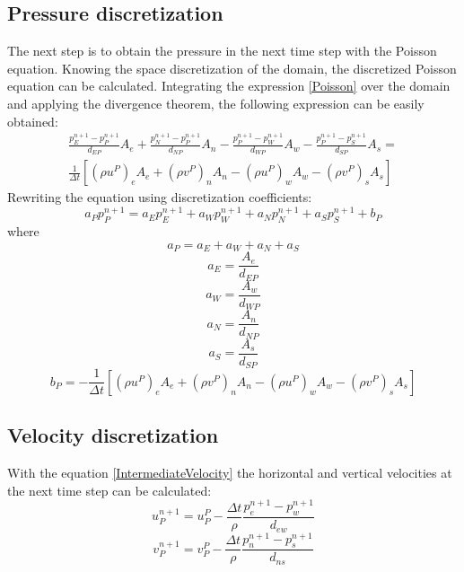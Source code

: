 \subsection{Pressure discretization}
The next step is to obtain the pressure in the next time step with the Poisson equation. Knowing the space discretization of the domain, the discretized Poisson equation can be calculated. Integrating the expression \ref{Poisson} over the domain and applying the divergence theorem, the following expression can be easily obtained:
\begin{equation}
\begin{aligned}
\frac{p_{E}^{n+1}-p_{P}^{n+1}}{d_{EP}}A_{e}+\frac{p_{N}^{n+1}-p_{P}^{n+1}}{d_{NP}}A_{n}-\frac{p_{P}^{n+1}-p_{W}^{n+1}}{d_{WP}}A_{w}-\frac{p_{P}^{n+1}-p_{S}^{n+1}}{d_{SP}}A_{s}= \\
\frac{1}{\Delta t}\left[\left(\rho u^{P}\right)_{e}A_{e}+\left(\rho v^{P}\right)_{n}A_{n}-\left(\rho u^{P}\right)_{w}A_{w}-\left(\rho v^{P}\right)_{s}A_{s}\right]
\end{aligned}
\end{equation}
Rewriting the equation using discretization coefficients:
\begin{equation}
a_{P}p_{P}^{n+1}=a_{E}p_{E}^{n+1}+a_{W}p_{W}^{n+1}+a_{N}p_{N}^{n+1}+a_{S}p_{S}^{n+1}+b_{P}
\end{equation}
where
\begin{equation}
a_{P}=a_{E}+a_{W}+a_{N}+a_{S}
\end{equation}
\begin{equation}
a_{E}=\frac{A_{e}}{d_{EP}}
\end{equation}
\begin{equation}
a_{W}=\frac{A_{w}}{d_{WP}}
\end{equation}
\begin{equation}
a_{N}=\frac{A_{n}}{d_{NP}}
\end{equation}
\begin{equation}
a_{S}=\frac{A_{s}}{d_{SP}}
\end{equation}
\begin{equation}
b_{P}=-\frac{1}{\Delta t}\left[\left(\rho u^{P}\right)_{e}A_{e}+\left(\rho v^{P}\right)_{n}A_{n}-\left(\rho u^{P}\right)_{w}A_{w}-\left(\rho v^{P}\right)_{s}A_{s}\right]
\end{equation}

\subsection{Velocity discretization}
With the equation \ref{IntermediateVelocity} the horizontal and vertical velocities at the next time step can be calculated:
\begin{equation}
u_{P}^{n+1}=u_{P}^{P}-\frac{\Delta t}{\rho}\frac{p_{e}^{n+1}-p_{w}^{n+1}}{d_{ew}}
\end{equation}
\begin{equation}
v_{P}^{n+1}=v_{P}^{P}-\frac{\Delta t}{\rho}\frac{p_{n}^{n+1}-p_{s}^{n+1}}{d_{ns}}
\end{equation}

